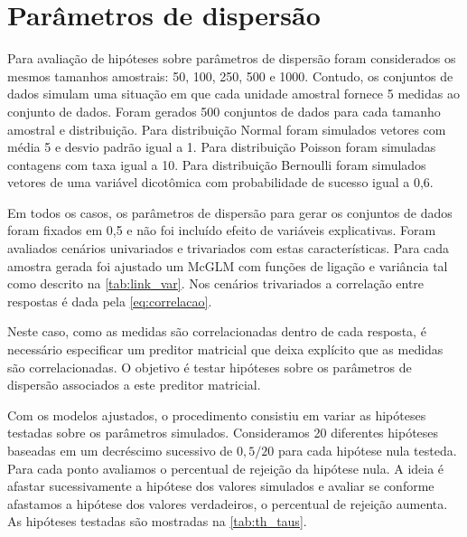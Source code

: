 \section{Parâmetros de dispersão}

Para avaliação de hipóteses sobre parâmetros de dispersão foram considerados os mesmos tamanhos amostrais: 50, 100, 250, 500 e 1000. Contudo, os conjuntos de dados simulam uma situação em que cada unidade amostral fornece 5 medidas ao conjunto de dados. Foram gerados 500 conjuntos de dados para cada tamanho amostral e distribuição. Para distribuição Normal foram simulados vetores com média 5 e desvio padrão igual a 1. Para distribuição Poisson foram simuladas contagens com taxa igual a 10. Para distribuição Bernoulli foram simulados vetores de uma variável dicotômica com probabilidade de sucesso igual a 0,6.

Em todos os casos, os parâmetros de dispersão para gerar os conjuntos de dados foram fixados em 0,5 e não foi incluído efeito de variáveis explicativas. Foram avaliados cenários univariados e trivariados com estas características. Para cada amostra gerada foi ajustado um McGLM com funções de ligação e variância tal como descrito na \autoref{tab:link_var}. Nos cenários trivariados a correlação entre respostas é dada pela \autoref{eq:correlacao}.

Neste caso, como as medidas são correlacionadas dentro de cada resposta, é necessário especificar um preditor matricial que deixa explícito que as medidas são correlacionadas. O objetivo é testar hipóteses sobre os parâmetros de dispersão associados a este preditor matricial. 

Com os modelos ajustados, o procedimento consistiu em variar as hipóteses testadas sobre os parâmetros simulados. Consideramos 20 diferentes hipóteses baseadas em um decréscimo sucessivo de $0,5/20$ para cada hipótese nula testeda. Para cada ponto avaliamos o percentual de rejeição da hipótese nula. A ideia é afastar sucessivamente a hipótese dos valores simulados e avaliar se conforme afastamos a hipótese dos valores verdadeiros, o percentual de rejeição aumenta. As hipóteses testadas são mostradas na \autoref{tab:th_taus}.

